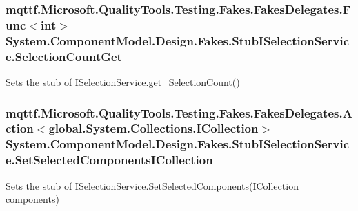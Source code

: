 \hypertarget{class_system_1_1_component_model_1_1_design_1_1_fakes_1_1_stub_i_selection_service_a32e8f1e9315dacbb7ecfc7fb8935fbb5}{
\subsubsection[{Selection\-Count\-Get}]{\setlength{\rightskip}{0pt plus 5cm}mqttf.\-Microsoft.\-Quality\-Tools.\-Testing.\-Fakes.\-Fakes\-Delegates.\-Func$<$int$>$ System.\-Component\-Model.\-Design.\-Fakes.\-Stub\-I\-Selection\-Service.\-Selection\-Count\-Get}}\label{class_system_1_1_component_model_1_1_design_1_1_fakes_1_1_stub_i_selection_service_a32e8f1e9315dacbb7ecfc7fb8935fbb5}


Sets the stub of I\-Selection\-Service.\-get\-\_\-\-Selection\-Count()

\hypertarget{class_system_1_1_component_model_1_1_design_1_1_fakes_1_1_stub_i_selection_service_a7a684a037005344caaa6590bfed877b2}{
\subsubsection[{Set\-Selected\-Components\-I\-Collection}]{\setlength{\rightskip}{0pt plus 5cm}mqttf.\-Microsoft.\-Quality\-Tools.\-Testing.\-Fakes.\-Fakes\-Delegates.\-Action$<$global.\-System.\-Collections.\-I\-Collection$>$ System.\-Component\-Model.\-Design.\-Fakes.\-Stub\-I\-Selection\-Service.\-Set\-Selected\-Components\-I\-Collection}}\label{class_system_1_1_component_model_1_1_design_1_1_fakes_1_1_stub_i_selection_service_a7a684a037005344caaa6590bfed877b2}


Sets the stub of I\-Selection\-Service.\-Set\-Selected\-Components(\-I\-Collection components)

